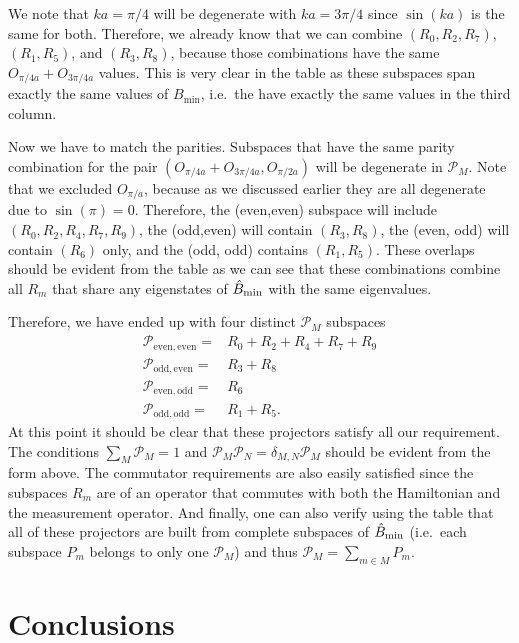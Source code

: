 We note that $ka = \pi/4$ will be degenerate with $ka = 3\pi/4$ since
$\sin(ka)$ is the same for both. Therefore, we already know that we
can combine $(R_0, R_2, R_7)$, $(R_1, R_5)$, and $(R_3, R_8)$, because
those combinations have the same $O_{\pi/4a} + O_{3\pi/4a}$
values. This is very clear in the table as these subspaces span
exactly the same values of $B_\mathrm{min}$, i.e.~the have exactly the
same values in the third column.

Now we have to match the parities. Subspaces that have the same parity
combination for the pair $(O_{\pi/4a} + O_{3\pi/4a}, O_{\pi/2a})$ will
be degenerate in $\mathcal{P}_M$. Note that we excluded $O_{\pi/a}$,
because as we discussed earlier they are all degenerate due to
$\sin(\pi) = 0$. Therefore, the (even,even) subspace will include
$(R_0, R_2, R_4, R_7, R_9)$, the (odd,even) will contain $(R_3, R_8)$,
the (even, odd) will contain $(R_6)$ only, and the (odd, odd) contains
$(R_1, R_5)$. These overlaps should be evident from the table as we
can see that these combinations combine all $R_m$ that share any
eigenstates of $\hat{B}_\mathrm{min}$ with the same eigenvalues.

Therefore, we have ended up with four distinct $\mathcal{P}_M$ subspaces
\begin{align}
\mathcal{P}_\mathrm{even,even} = & R_0 + R_2 + R_4 + R_7 + R_9
  \nonumber \\
\mathcal{P}_\mathrm{odd,even} = & R_3 + R_8 \nonumber \\
\mathcal{P}_\mathrm{even,odd} = & R_6 \nonumber \\
\mathcal{P}_\mathrm{odd,odd} = & R_1 + R_5 \nonumber.
\end{align}
At this point it should be clear that these projectors satisfy all our
requirement. The conditions $\sum_M \mathcal{P}_M = 1$ and
$\mathcal{P}_M \mathcal{P}_N = \delta_{M,N} \mathcal{P}_M$ should be
evident from the form above. The commutator requirements are also
easily satisfied since the subspaces $R_m$ are of an operator that
commutes with both the Hamiltonian and the measurement operator. And
finally, one can also verify using the table that all of these
projectors are built from complete subspaces of $\hat{B}_\mathrm{min}$ (i.e.~each
subspace $P_m$ belongs to only one $\mathcal{P}_M$) and thus
$\mathcal{P}_M = \sum_{m \in M} P_m$.

\section{Conclusions}

